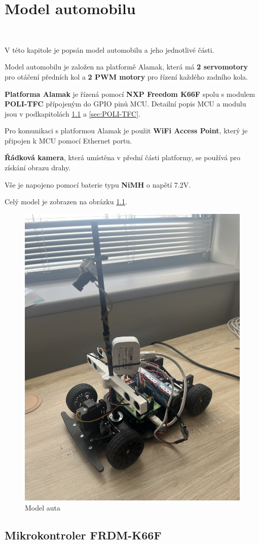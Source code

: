 \chapter{Model automobilu}
\label{sec:CarModel}\

V této kapitole je popsán model automobilu a jeho jednotlivé části.

Model automobilu je založen na platformě Alamak, která má
\textbf{2 servomotory} pro otáčení předních kol a
\textbf{2 PWM motory} pro řízení každého
zadního kola.

\textbf{Platforma Alamak} je řízená pomocí \textbf{NXP Freedom K66F}\cite{frdmk66UserGuide} spolu
s modulem \textbf{POLI-TFC} přípojeným do GPIO pinů MCU.
Detailní popis MCU a modulu jsou v podkapitolách \ref{sec:FRDM-K66F}
a \ref{sec:POLI-TFC}.

Pro komunikaci s platformou Alamak je použit \textbf{WiFi Access Point}, který je připojen k MCU
pomocí Ethernet portu.

\textbf{Řádková kamera}, která umístěna v přední části platformy,
se používá pro získání obrazu drahy.

Vše je napojeno pomocí baterie typu \textbf{NiMH} o napětí 7.2V.

Celý model je zobrazen na obrázku \ref{fig:car}.
\begin{figure}[h]
    \centering
    \includegraphics[width=0.45\linewidth, angle=-90]{Figures/car.jpeg}
    \caption{Model auta}
    \label{fig:car}
\end{figure}

\section{Mikrokontroler FRDM-K66F}
\label{sec:FRDM-K66F}\

